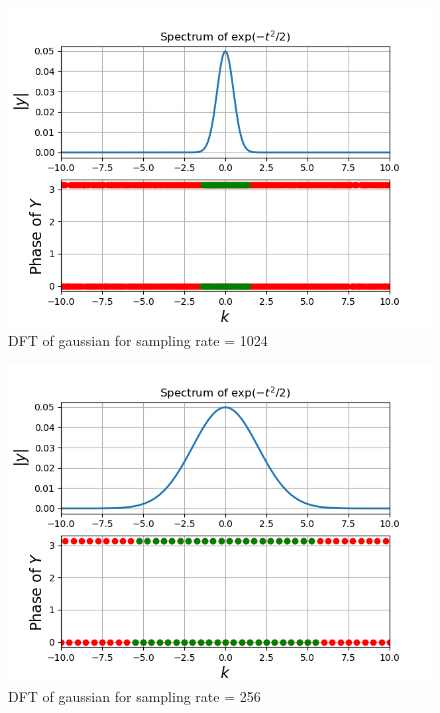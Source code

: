 \documentclass[11pt, a4paper]{article}
\begin{document}
\begin{figure}[!tbh]
   	\centering
   	\includegraphics[scale=0.5]{fig9.png}  %
   	\caption{DFT of gaussian for sampling rate = 1024}
   	\label{fig:sample}
   \end{figure} 
 
 \begin{figure}[!tbh]
   	\centering
   	\includegraphics[scale=0.5]{fig8.png}  %
   	\caption{DFT of gaussian for sampling rate = 256}
   	\label{fig:sample}
   \end{figure} 
\end{document}
